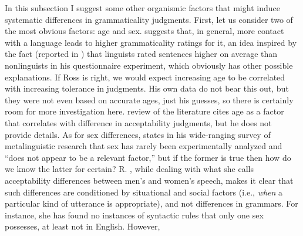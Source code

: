In this subsection I suggest some other organismic factors that might induce systematic differences in grammaticality judgments. First, let us consider two of the most obvious factors: age and sex. \citet{Ross1979} suggests that, in general, more contact with a language leads to higher grammaticality ratings for it, an idea inspired by the fact (reported in ) that linguists rated sentences higher on average than nonlinguists in his questionnaire experiment, which obviously has other possible explanations. If Ross is right, we would expect increasing age to be correlated with increasing tolerance in judgments. His own data do not bear this out, but they were not even based on accurate ages, just his guesses, so there is certainly room for more investigation here.  review of the literature cites age as a factor that correlates with difference in acceptability judgments, but he does not provide details. As for sex differences, \citet{Chaudron1983} states in his wide-ranging survey of metalinguistic research that sex has rarely been experimentally analyzed and ``does not appear to be a relevant factor,'' but if the former is true then how do we know the latter for certain? R. \citet{Lakoff1977}, while dealing with what she calls acceptability differences between men's and women's speech, makes it clear that such differences are conditioned by situational and social factors (i.e., \textit{when} a particular kind of utterance is appropriate), and not differences in grammars. For instance, she has found no instances of syntactic rules that only one sex possesses, at least not in English. However, \citet{Bever1992}
